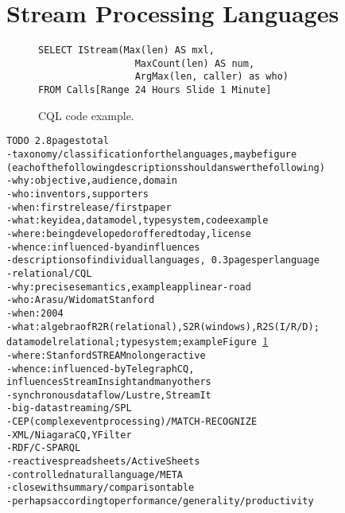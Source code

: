 \section{Stream Processing Languages}\label{sec:languages}

\begin{figure}
\begin{lstlisting}
SELECT IStream(Max(len) AS mxl,
                 MaxCount(len) AS num,
                 ArgMax(len, caller) as who)
FROM Calls[Range 24 Hours Slide 1 Minute]
\end{lstlisting}
\vspace*{-4mm}
\caption{\label{fig:cql}CQL code example.}
\end{figure}

\begin{alltt}TODO\scriptsize ~2.8 pages total
- taxonomy/classification for the languages, maybe figure
  (each of the following descriptions should answer the following)
  - why: objective, audience, domain
  - who: inventors, supporters
  - when: first release / first paper
  - what: key idea, data model, type system, code example
  - where: being developed or offered today, license
  - whence: influenced-by and influences
- descriptions of individual languages, ~0.3 pages per language
  - relational / CQL \cite{arasu_babu_widom_2006}
    - why: precise semantics \cite{arasu_widom_2004}, example app linear-road \cite{arasu_et_al_2004}
    - who: Arasu/Widom at Stanford
    - when: 2004
    - what: algebra of R2R (relational), S2R (windows), R2S (I/R/D);
      data model relational; type system \cite{soule_et_al_2016}; example Figure~\ref{fig:cql}
    - where: Stanford STREAM no longer active
    - whence: influenced-by TelegraphCQ \cite{chandrasekaran_et_al_2003},
      influences StreamInsight \cite{ali_et_al_2009} and many others
  - synchronous dataflow / Lustre \cite{caspi_et_al_1987}, StreamIt \cite{thies_et_al_2002}
  - big-data streaming / SPL \cite{hirzel_schneider_gedik_2017} \cite{soule_et_al_2010}
  - CEP (complex event processing) / MATCH-RECOGNIZE \cite{zemke_et_al_2007} \cite{hirzel_2012}
  - XML / NiagaraCQ \cite{chen_et_al_2000}, YFilter \cite{diao_et_al_2002}
  - RDF / C-SPARQL \cite{barbieri_et_al_2009}
  - reactive spreadsheets / ActiveSheets \cite{vaziri_et_al_2014}
  - controlled natural language / META \cite{arnold_et_al_2016}
- close with summary/comparison table
  - perhaps according to performance/generality/productivity
\end{alltt}
